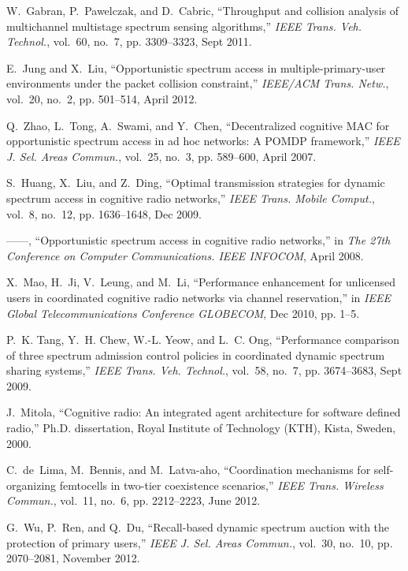 \begin{thebibliography}{1}
W.~Gabran, P.~Pawelczak, and D.~Cabric, ``Throughput and collision analysis of
  multichannel multistage spectrum sensing algorithms,'' \emph{{IEEE} Trans.
  Veh. Technol.}, vol.~60, no.~7, pp. 3309--3323, Sept 2011.

E.~Jung and X.~Liu, ``Opportunistic spectrum access in multiple-primary-user
  environments under the packet collision constraint,'' \emph{{IEEE/ACM} Trans.
  Netw.}, vol.~20, no.~2, pp. 501--514, April 2012.

Q.~Zhao, L.~Tong, A.~Swami, and Y.~Chen, ``Decentralized cognitive {MAC} for
  opportunistic spectrum access in ad hoc networks: A {POMDP} framework,''
  \emph{{IEEE} J. Sel. Areas Commun.}, vol.~25, no.~3, pp. 589--600, April
  2007.

S.~Huang, X.~Liu, and Z.~Ding, ``Optimal transmission strategies for dynamic
  spectrum access in cognitive radio networks,'' \emph{{IEEE} Trans. Mobile
  Comput.}, vol.~8, no.~12, pp. 1636--1648, Dec 2009.

------, ``Opportunistic spectrum access in cognitive radio networks,'' in
  \emph{The 27th Conference on Computer Communications. {IEEE} {INFOCOM}},
  April 2008.

X.~Mao, H.~Ji, V.~Leung, and M.~Li, ``Performance enhancement for unlicensed
  users in coordinated cognitive radio networks via channel reservation,'' in
  \emph{IEEE Global Telecommunications Conference {GLOBECOM}}, Dec 2010, pp.
  1--5.

P.~K. Tang, Y.~H. Chew, W.-L. Yeow, and L.~C. Ong, ``Performance comparison of
  three spectrum admission control policies in coordinated dynamic spectrum
  sharing systems,'' \emph{{IEEE} Trans. Veh. Technol.}, vol.~58, no.~7, pp.
  3674--3683, Sept 2009.

J.~Mitola, ``Cognitive radio: An integrated agent architecture for software
  defined radio,'' Ph.D. dissertation, Royal Institute of Technology (KTH),
  Kista, Sweden, 2000.

C.~de~Lima, M.~Bennis, and M.~Latva-aho, ``Coordination mechanisms for
  self-organizing femtocells in two-tier coexistence scenarios,'' \emph{{IEEE}
  Trans. Wireless Commun.}, vol.~11, no.~6, pp. 2212--2223, June 2012.

G.~Wu, P.~Ren, and Q.~Du, ``Recall-based dynamic spectrum auction with the
  protection of primary users,'' \emph{{IEEE} J. Sel. Areas Commun.}, vol.~30,
  no.~10, pp. 2070--2081, November 2012.


\end{thebibliography}
